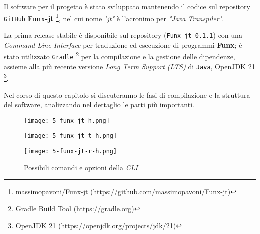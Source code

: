 \chapter{}
\label{chap:5-compiler}

Il software per il progetto è stato sviluppato mantenendo il codice sul repository \texttt{GitHub} \textbf{Funx-jt}%
\footnote{massimopavoni/Funx-jt (\url{https://github.com/massimopavoni/Funx-jt})},
nel cui nome \textit{"jt"} è l'acronimo per \textit{"Java Transpiler"}.

\noindent La prima release stabile è disponibile sul repository (\texttt{Funx-jt-0.1.1})
con una \textit{Command Line Interface} per traduzione ed esecuzione di programmi \textbf{Funx};
è stato utilizzato \texttt{Gradle}%
\footnote{Gradle Build Tool (\url{https://gradle.org})}
per la compilazione e la gestione delle dipendenze,
assieme alla più recente versione \textit{Long Term Support (LTS)} di \texttt{Java}, OpenJDK 21%
\footnote{OpenJDK 21 (\url{https://openjdk.org/projects/jdk/21})}.

Nel corso di questo capitolo si discuteranno le fasi di compilazione e la struttura del software,
analizzando nel dettaglio le parti più importanti.

\begin{figure}
    \vspace{4mm}
    \begin{minipage}{0.85\textwidth}
        \texttt{[image: 5-funx-jt-h.png]}
        \vspace{2mm}
    \end{minipage}
    \begin{minipage}{0.85\textwidth}
        \texttt{[image: 5-funx-jt-t-h.png]}
        \vspace{2mm}
    \end{minipage}
    \begin{minipage}{0.85\textwidth}
        \texttt{[image: 5-funx-jt-r-h.png]}
    \end{minipage}
    \caption{Possibili comandi e opzioni della \textit{CLI}}
    \label{fig:5-compiler-cli}
\end{figure}

\newpage



\newpage



\newpage



\newpage

